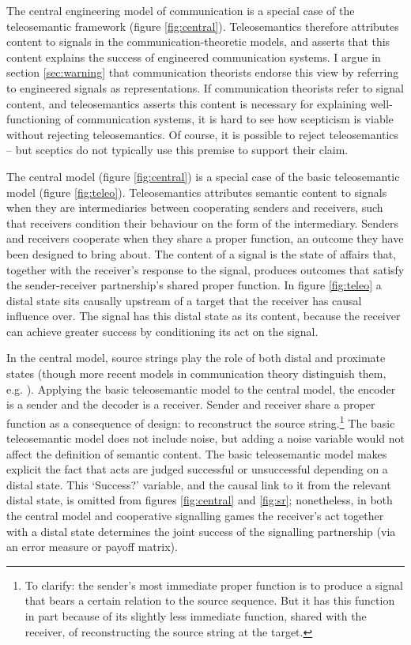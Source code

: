 \documentclass[12pt]{article}
\begin{document}
The central engineering model of communication is a special case of the teleosemantic framework (figure \ref{fig:central}).
Teleosemantics therefore attributes content to signals in the communication-theoretic models, and asserts that this content explains the success of engineered communication systems.
I argue in section \ref{sec:warning} that communication theorists endorse this view by referring to engineered signals as representations.
If communication theorists refer to signal content, and teleosemantics asserts this content is necessary for explaining well-functioning of communication systems, it is hard to see how scepticism is viable without rejecting teleosemantics.
Of course, it is possible to reject teleosemantics -- but sceptics do not typically use this premise to support their claim.



The central model (figure \ref{fig:central}) is a special case of the basic teleosemantic model (figure \ref{fig:teleo}).
Teleosemantics attributes semantic content to signals when they are intermediaries between cooperating senders and receivers, such that receivers condition their behaviour on the form of the intermediary.
Senders and receivers cooperate when they share a proper function, an outcome they have been designed to bring about.
The content of a signal is the state of affairs that, together with the receiver's response to the signal, produces outcomes that satisfy the sender-receiver partnership's shared proper function.
In figure \ref{fig:teleo} a distal state sits causally upstream of a target that the receiver has causal influence over.
The signal has this distal state as its content, because the receiver can achieve greater success by conditioning its act on the signal.

In the central model, source strings play the role of both distal and proximate states (though more recent models in communication theory distinguish them, e.g. \citet{berger1996ceo}).
Applying the basic teleosemantic model to the central model, the encoder is a sender and the decoder is a receiver.
Sender and receiver share a proper function as a consequence of design: to reconstruct the source string.\footnote{To clarify: the sender's most immediate proper function is to produce a signal that bears a certain relation to the source sequence. But it has this function in part because of its slightly less immediate function, shared with the receiver, of reconstructing the source string at the target.}
The basic teleosemantic model does not include noise, but adding a noise variable would not affect the definition of semantic content.
The basic teleosemantic model makes explicit the fact that acts are judged successful or unsuccessful depending on a distal state.
This `Success?' variable, and the causal link to it from the relevant distal state, is omitted from figures \ref{fig:central} and \ref{fig:sr}; nonetheless, in both the central model and cooperative signalling games the receiver's act together with a distal state determines the joint success of the signalling partnership (via an error measure or payoff matrix).
\end{document}
